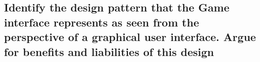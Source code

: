 \subsection*{ Identify the design pattern that the Game interface represents as seen from the perspective of a graphical user interface.
Argue for benefits and liabilities of this design }



